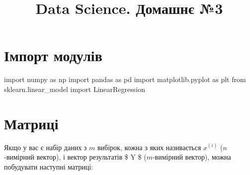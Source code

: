 \documentclass[]{article}
\title{Data Science. Домашнє №3}
\newcounter{pythoncode}
\begin{document}
\maketitle

\section*{Імпорт модулів}

\begin{pythoncode}
import numpy as np
import pandas as pd
import matplotlib.pyplot as plt
from sklearn.linear_model import LinearRegression
\end{pythoncode}

\section*{Матриці}

Якщо у вас є набір даних з \(m\) вибірок, кожна з яких називається
\(x^{(i)}\) (\(n\)-вимірний вектор), і вектор результатів \$ Y \$
(\(m\)-вимірний вектор), можна побудувати наступні матриці:
\end{document}
